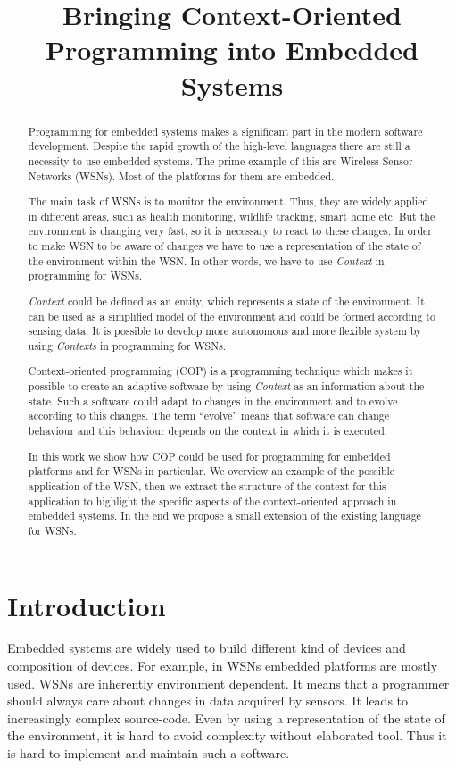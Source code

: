 \documentclass{ubicomp-ext}
\title{Bringing Context-Oriented Programming into Embedded Systems}
\author{
  \vspace{-1.5em} %
  \alignauthor{
  	\textbf{First Author}\\
  	\affaddr{AuthorCo, Inc.}\\
  	\affaddr{123 Author Ave.}\\
  	\affaddr{Authortown, PA 54321 USA}\\
  	\email{author1@anotherco.com}
  }\alignauthor{
  	\textbf{Fifth Author}\\
  	\affaddr{AuthorCo, Inc.}\\
  	\affaddr{123 Author Ave.}\\
  	\affaddr{Authortown, PA 54321 USA}\\
  	\email{author5@anotherco.com}
  }
  \vfil
}
\begin{document}
\maketitle

\begin{abstract}
Programming for embedded systems makes a significant part in the modern software development. Despite the rapid growth of the high-level languages there are still a necessity to use embedded systems. The prime example of this are Wireless Sensor Networks (WSNs). Most of the platforms for them are embedded.

The main task of WSNs is to monitor the environment. Thus, they are widely applied in different areas, such as health monitoring, wildlife tracking, smart home etc. But the environment is changing very fast, so it is necessary to react to these changes. In order to make WSN to be aware of changes we have to use a representation of the state of the environment within the WSN. In other words, we have to use \textit{Context} in programming for WSNs.

\textit{Context} could be defined as an entity, which represents a state of the environment. It can be used as a simplified model of the environment and could be formed according to sensing data. It is possible to develop more autonomous and more flexible system by using \textit{Contexts} in programming for WSNs.

Context-oriented programming (COP) is a programming technique which makes it possible to create an adaptive software by using \textit{Context} as an information about the state. Such a software could adapt to changes in the environment and to evolve according to this changes. The term ``evolve'' means that software can change behaviour and this behaviour depends on the context in which it is executed.

In this work we show how COP could be used for programming for embedded platforms and for WSNs in particular. We overview an example of the possible application of the WSN, then we extract the structure of the context for this application to highlight the specific aspects of the context-oriented approach in embedded systems. In the end we propose a small extension of the existing language for WSNs.
\end{abstract}
\section{Introduction}
Embedded systems are widely used to build different kind of devices and composition of devices. For example, in WSNs embedded platforms are mostly used. WSNs are inherently environment dependent. It  means that a programmer should always care about changes in data acquired by sensors. It leads to increasingly complex source-code. Even by using a representation of the state of the environment, it is hard to avoid complexity without elaborated tool. Thus it is hard to implement and maintain such a software.
\end{document}
